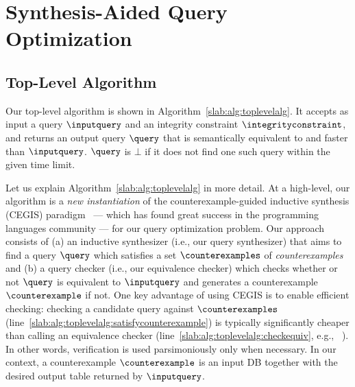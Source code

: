 \section{Synthesis-Aided Query Optimization}
\label{slab:sec:alg}



 


\subsection{Top-Level Algorithm}
\label{slab:sec:toplevelalg}
Our top-level algorithm is shown in Algorithm~\ref{slab:alg:toplevelalg}. It accepts as input a query $\inputquery$ and an integrity constraint $\integrityconstraint$, and returns an output query $\query$ that is semantically equivalent to and faster than $\inputquery$. 
$\query$ is $\bot$ if it does not find one such query within the given time limit. 




Let us explain Algorithm~\ref{slab:alg:toplevelalg} in more detail. At a high-level, our algorithm is a \emph{new instantiation} of the counterexample-guided inductive synthesis (CEGIS) paradigm~\cite{solar2008program} --- which has found great success in the programming languages community --- for our query optimization problem. 
Our approach consists of (a) an inductive synthesizer (i.e., our query synthesizer) that aims to find a query $\query$ which satisfies a set $\counterexamples$ of \emph{counterexamples} and (b) a query checker (i.e., our equivalence checker) which checks whether or not $\query$ is equivalent to $\inputquery$ and generates a counterexample $\counterexample$ if not. 
One key advantage of using CEGIS is to enable efficient checking: checking a candidate query against $\counterexamples$ (line~\ref{slab:alg:toplevelalg:satisfycounterexample}) is typically significantly cheaper than calling an equivalence checker (line~\ref{slab:alg:toplevelalg:checkequiv}, e.g., \spes~\cite{zhou2022spes}). In other words, verification is used parsimoniously only when necessary. 
In our context, a counterexample $\counterexample$ is an input DB together with the desired output table returned by $\inputquery$. 




